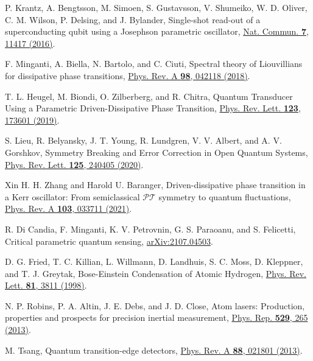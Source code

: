 \documentclass[twocolumn,prl,floatfix,citeautoscript,nofootinbib,superscriptaddress]{revtex4}
\begin{document}
\begin{thebibliography}{99}
 P. Krantz, A. Bengtsson, M. Simoen, S. Gustavsson, V. Shumeiko, W. D. Oliver, C. M. Wilson, P. Delsing, and J. Bylander, Single-shot read-out of a superconducting qubit using a Josephson parametric oscillator, \href{https://doi.org/10.1038/ncomms11417}%
{Nat. Commun. \textbf{7}, 11417 (2016)}.

 F. Minganti, A. Biella, N. Bartolo, and C. Ciuti, Spectral theory of Liouvillians for dissipative phase transitions, \href{https://doi.org/10.1103/PhysRevA.98.042118}%
{Phys. Rev. A \textbf{98}, 042118 (2018)}.

 T. L. Heugel, M. Biondi, O. Zilberberg, and R. Chitra, Quantum Transducer Using a Parametric Driven-Dissipative Phase Transition, \href{https://doi.org/10.1103/PhysRevLett.123.173601}%
{Phys. Rev. Lett. \textbf{123}, 173601 (2019)}.

 S. Lieu, R. Belyansky, J. T. Young, R. Lundgren, V. V. Albert, and A. V. Gorshkov, Symmetry Breaking and Error Correction in Open Quantum Systems, \href{https://doi.org/10.1103/PhysRevLett.125.240405}%
{Phys. Rev. Lett. \textbf{125}, 240405 (2020)}.

 Xin H. H. Zhang and Harold U. Baranger, Driven-dissipative phase transition in a Kerr oscillator: From semiclassical $\mathcal{PT}$ symmetry to quantum fluctuations, \href{https://doi.org/10.1103/PhysRevA.103.033711}%
{Phys. Rev. A \textbf{103}, 033711 (2021)}.

 R. Di Candia, F. Minganti, K. V. Petrovnin, G. S. Paraoanu, and S. Felicetti, Critical parametric quantum sensing, \href{https://doi.org/10.48550/arXiv.2107.04503}%
{arXiv:2107.04503}.



 D. G. Fried, T. C. Killian, L. Willmann, D. Landhuis, S. C. Moss, D. Kleppner, and T. J. Greytak, Bose-Einstein Condensation of Atomic Hydrogen, \href{https://doi.org/10.1103/PhysRevLett.81.3811}{Phys. Rev.
Lett. \textbf{81}, 3811 (1998)}.

 N. P. Robins, P. A. Altin, J. E. Debs, and J. D. Close, Atom lasers: Production, properties and prospects for precision inertial measurement, \href{https://doi.org/10.1016/j.physrep.2013.03.006}{Phys. Rep. \textbf{529}, 265 (2013)}.

 M. Tsang, Quantum transition-edge detectors,
\href{https://doi.org/10.1103/PhysRevA.88.021801}{Phys. Rev. A \textbf{88},
021801 (2013)}.


\end{thebibliography}
\end{document}
